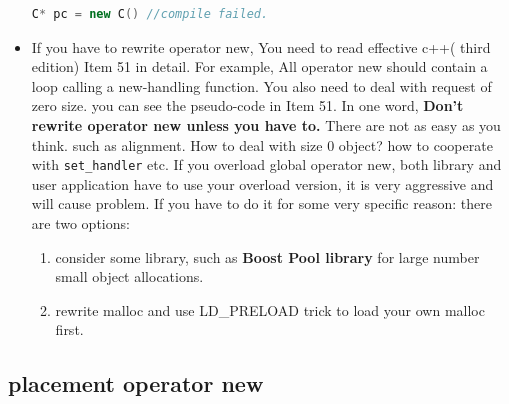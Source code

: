 \documentclass[a4paper,11pt,twoside]{book}
\begin{document}
\begin{itemize}
\begin{lstlisting}[frame=single, language=c++, mathescape=true]
C* pc = new C() //compile failed.
\end{lstlisting}

	\item If you have to rewrite operator new, You need to read  effective c++( third edition) Item 51 in detail. For example, All operator new should contain a loop calling a new-handling function.  You also need to deal with request of zero size. you can see the pseudo-code in Item 51. In one word, \textbf{Don't rewrite operator new unless you have to.} There are not as easy as you think. such as alignment. How to deal with size 0 object? how to cooperate with \texttt{set\_handler} etc. If you overload global operator new, both library and user application have to use your overload version, it is very aggressive and will cause problem.  If you have to do it for some very specific reason: there are two options:
	
	\begin{enumerate}
		\item consider some library, such as \textbf{Boost Pool library} for large number small object allocations. 
		\item rewrite malloc and use LD\_PRELOAD trick to load your own malloc first.
	\end{enumerate}
\end{itemize}

\subsection{placement operator new}
\end{document}
